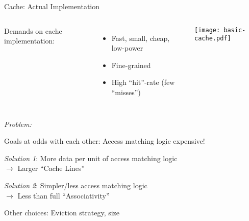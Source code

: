 \documentclass[english,compress]{beamer}
\begin{document}
\begin{frame}{Cache: Actual Implementation}
  \begin{columns}
      Demands on cache implementation:
      \begin{itemize}
        \item Fast, small, cheap, low-power
        \item Fine-grained
        \item High ``hit''-rate (few ``misses'')
      \end{itemize}

      \texttt{[image: basic-cache.pdf]}
  \end{columns}

  \bigskip
  \emph{Problem:}

  \colorbox{gray!20}{
  Goals at odds with each other:
  Access matching logic expensive!
  }

  \bigskip
  \emph{Solution 1}: More data per unit of access matching logic\\
  \hfill $\rightarrow$ Larger ``Cache Lines''

  \bigskip
  \emph{Solution 2}: Simpler/less access matching logic\\
  \hfill $\rightarrow$ Less than full ``Associativity''

  \bigskip
  Other choices: Eviction strategy, size
\end{frame}
\end{document}
